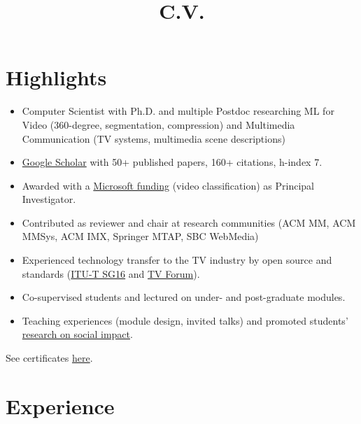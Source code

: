 \documentclass[10pt,a4paper,sans,colorlinks]{moderncv}
\title{C.V.}
\begin{document}
\setHyperrefBlueLinks
\makecvtitle
\vspace{-2em}

\section{Highlights}

\begin{itemize}
    \item Computer Scientist with Ph.D. and multiple Postdoc researching ML for Video (360-degree, segmentation, compression) and Multimedia Communication (TV systems, multimedia scene descriptions)
    \item \href{https://scholar.google.com/citations?user=1bEOmkUAAAAJ&hl=en}{Google Scholar} with 50+ published papers, 160+ citations, h-index 7.
    \item Awarded with a \href{https://www.rnp.br/en/rnp-and-microsoft-challenge-artificial-intelligence}{Microsoft funding} (video classification) as Principal Investigator.
    \item Contributed as reviewer and chair at research communities (ACM MM, ACM MMSys, ACM IMX, Springer MTAP, SBC WebMedia)
    \item Experienced technology transfer to the TV industry by open source and standards (\href{http://www.itu.int/en/ITU-T/studygroups/2022-2024/16}{ITU-T SG16} and \href{http://forumsbtvd.org.br}{TV Forum}).
    \item Co-supervised students and lectured on under- and post-graduate modules.
    \item Teaching experiences (module design, invited talks) and promoted students' \href{https://webmedia.org.br/2022/en/lf-award/}{research on social impact}.
\end{itemize}

See certificates \href{https://alanlivio.github.io/certificates.pdf}{here}.

\section{Experience}
\end{document}
